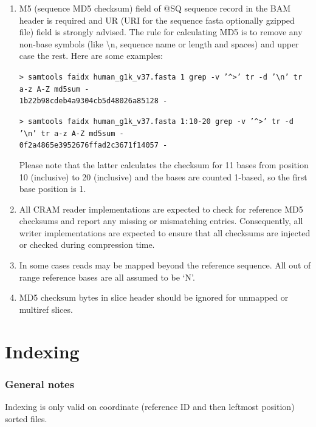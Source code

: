 \documentclass[a4paper]{article}
\begin{document}
\begin{enumerate}
\item M5 (sequence MD5 checksum) field of @SQ sequence record in the BAM header is 
required and UR (URI for the sequence fasta optionally gzipped file) field is strongly 
advised. The rule for calculating MD5 is to remove any non-base symbols (like \textbackslash{}n, 
sequence name or length and spaces) and upper case the rest. Here are some examples: 

\texttt{> samtools faidx human\_g1k\_v37.fasta 1 \textbar{} grep -v '\textasciicircum{}>' \textbar{} tr -d '\textbackslash{}n' \textbar{} tr a-z A-Z \textbar{} md5sum -\\
1b22b98cdeb4a9304cb5d48026a85128  -}

\texttt{> samtools faidx human\_g1k\_v37.fasta 1:10-20 \textbar{}grep -v '\textasciicircum{}\texttt{>}' \textbar{}tr -d '\textbackslash{}n' \textbar{}tr a-z A-Z \textbar{}md5sum -\\
0f2a4865e3952676ffad2c3671f14057  -}

Please note that the latter calculates the checksum for 11 bases from position 
10 (inclusive) to 20 (inclusive) and the bases are counted 1-based, so the first 
base position is 1. 

\item All CRAM reader implementations are expected to check for reference MD5 checksums 
and report any missing or mismatching entries. Consequently, all writer implementations 
are expected to ensure that all checksums are injected or checked during compression 
time. 

\item In some cases reads may be mapped beyond the reference sequence. All out of 
range reference bases are all assumed to be `N'. 

\item MD5 checksum bytes in slice header should be ignored for unmapped or multiref 
slices. 
\end{enumerate}

\section{\textbf{Indexing}}

\subsubsection*{General notes}

Indexing is only valid on coordinate (reference ID and then leftmost position) sorted files.
\end{document}
